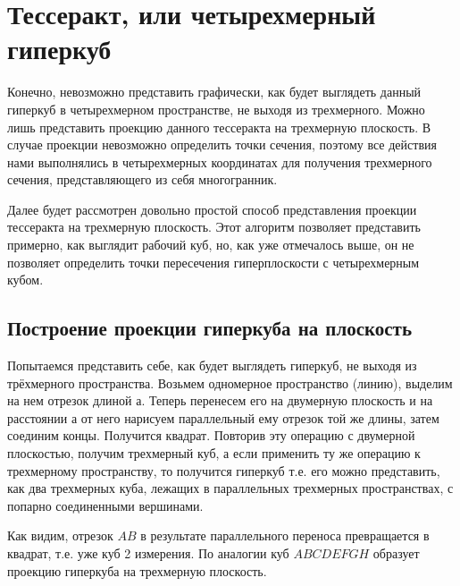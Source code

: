 \documentclass[12pt, a4paper, twoside]{report}
\begin{document}
\section{Тессеракт, или четырехмерный гиперкуб}
Конечно, невозможно представить графически, как будет выглядеть данный гиперкуб в четырехмерном пространстве, не выходя из трехмерного. Можно лишь представить проекцию данного тессеракта на трехмерную плоскость. В случае проекции невозможно определить точки сечения, поэтому все действия нами выполнялись в четырехмерных координатах для получения трехмерного сечения, представляющего из себя многогранник.

Далее будет рассмотрен довольно простой способ представления проекции тессеракта на трехмерную плоскость. Этот алгоритм позволяет представить примерно, как выглядит рабочий куб, но, как уже отмечалось выше, он не позволяет определить точки пересечения гиперплоскости с четырехмерным кубом.
\subsection{Построение проекции гиперкуба на плоскость}
Попытаемся представить себе, как будет выглядеть гиперкуб, не выходя из трёхмерного пространства. Возьмем одномерное пространство (линию), выделим на нем отрезок длиной $а$. Теперь перенесем его на двумерную плоскость и на расстоянии $а$ от него нарисуем параллельный ему отрезок той же длины, затем соединим концы. Получится квадрат. Повторив эту операцию с двумерной плоскостью, получим трехмерный куб, а если применить ту же операцию к трехмерному пространству, то получится гиперкуб т.е. его можно представить, как два трехмерных куба, лежащих в параллельных трехмерных пространствах, с попарно соединенными вершинами.

\begin{figure}[h!]
	\clearpage
\end{figure}

Как видим, отрезок $AB$ в результате параллельного переноса превращается в квадрат, т.е. уже куб 2 измерения. По аналогии куб $ABCDEFGH$ образует проекцию гиперкуба на трехмерную плоскость.
\end{document}

